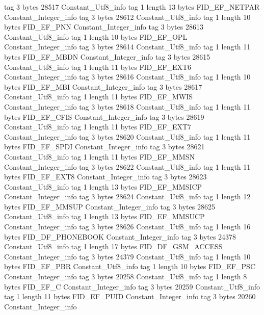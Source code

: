 {{{			tag	3
			bytes	28517
		}
		Constant_Utf8_info {
			tag	1
			length	13
			bytes	FID_EF_NETPAR
		}
		Constant_Integer_info {
			tag	3
			bytes	28612
		}
		Constant_Utf8_info {
			tag	1
			length	10
			bytes	FID_EF_PNN
		}
		Constant_Integer_info {
			tag	3
			bytes	28613
		}
		Constant_Utf8_info {
			tag	1
			length	10
			bytes	FID_EF_OPL
		}
		Constant_Integer_info {
			tag	3
			bytes	28614
		}
		Constant_Utf8_info {
			tag	1
			length	11
			bytes	FID_EF_MBDN
		}
		Constant_Integer_info {
			tag	3
			bytes	28615
		}
		Constant_Utf8_info {
			tag	1
			length	11
			bytes	FID_EF_EXT6
		}
		Constant_Integer_info {
			tag	3
			bytes	28616
		}
		Constant_Utf8_info {
			tag	1
			length	10
			bytes	FID_EF_MBI
		}
		Constant_Integer_info {
			tag	3
			bytes	28617
		}
		Constant_Utf8_info {
			tag	1
			length	11
			bytes	FID_EF_MWIS
		}
		Constant_Integer_info {
			tag	3
			bytes	28618
		}
		Constant_Utf8_info {
			tag	1
			length	11
			bytes	FID_EF_CFIS
		}
		Constant_Integer_info {
			tag	3
			bytes	28619
		}
		Constant_Utf8_info {
			tag	1
			length	11
			bytes	FID_EF_EXT7
		}
		Constant_Integer_info {
			tag	3
			bytes	28620
		}
		Constant_Utf8_info {
			tag	1
			length	11
			bytes	FID_EF_SPDI
		}
		Constant_Integer_info {
			tag	3
			bytes	28621
		}
		Constant_Utf8_info {
			tag	1
			length	11
			bytes	FID_EF_MMSN
		}
		Constant_Integer_info {
			tag	3
			bytes	28622
		}
		Constant_Utf8_info {
			tag	1
			length	11
			bytes	FID_EF_EXT8
		}
		Constant_Integer_info {
			tag	3
			bytes	28623
		}
		Constant_Utf8_info {
			tag	1
			length	13
			bytes	FID_EF_MMSICP
		}
		Constant_Integer_info {
			tag	3
			bytes	28624
		}
		Constant_Utf8_info {
			tag	1
			length	12
			bytes	FID_EF_MMSUP
		}
		Constant_Integer_info {
			tag	3
			bytes	28625
		}
		Constant_Utf8_info {
			tag	1
			length	13
			bytes	FID_EF_MMSUCP
		}
		Constant_Integer_info {
			tag	3
			bytes	28626
		}
		Constant_Utf8_info {
			tag	1
			length	16
			bytes	FID_DF_PHONEBOOK
		}
		Constant_Integer_info {
			tag	3
			bytes	24378
		}
		Constant_Utf8_info {
			tag	1
			length	17
			bytes	FID_DF_GSM_ACCESS
		}
		Constant_Integer_info {
			tag	3
			bytes	24379
		}
		Constant_Utf8_info {
			tag	1
			length	10
			bytes	FID_EF_PBR
		}
		Constant_Utf8_info {
			tag	1
			length	10
			bytes	FID_EF_PSC
		}
		Constant_Integer_info {
			tag	3
			bytes	20258
		}
		Constant_Utf8_info {
			tag	1
			length	8
			bytes	FID_EF_C
		}
		Constant_Integer_info {
			tag	3
			bytes	20259
		}
		Constant_Utf8_info {
			tag	1
			length	11
			bytes	FID_EF_PUID
		}
		Constant_Integer_info {
			tag	3
			bytes	20260
		}
		Constant_Integer_info {
}}}
